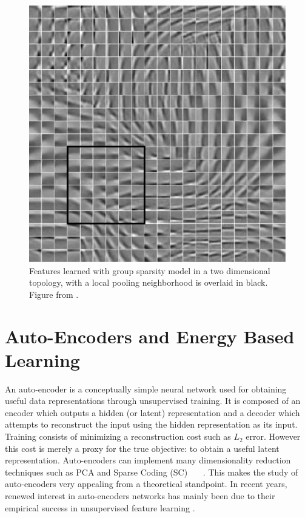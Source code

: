 \begin{figure} 
\centering
\includegraphics[scale=0.4]{./figures/related_work/PSD.png} 
\caption{Features learned with group sparsity model in a two dimensional topology, 
with a local pooling neighborhood is overlaid in black. Figure from \cite{groupSparsity}.}
\label{fig:GSC_features} 
\end{figure} 
 
\section{Auto-Encoders and Energy Based Learning} 

An auto-encoder is a conceptually simple neural network used for obtaining
useful data representations through unsupervised training. It is composed of an
encoder which outputs a hidden (or latent) representation and a decoder which
attempts to reconstruct the input using the hidden representation as its input.
Training consists of minimizing a reconstruction cost such as $L_2$ error.
However this cost is merely a proxy for the true objective: to obtain a useful
latent representation. Auto-encoders can  implement many dimensionality
reduction techniques such as PCA and Sparse Coding (SC)
~\cite{DHS}~\cite{SC}~\cite{LISTA}. This makes the study of auto-encoders very
appealing from a theoretical standpoint. In recent years, renewed interest in
auto-encoders networks has mainly been due to their empirical success in
unsupervised feature learning \cite{SAE1}\cite{SAE2}\cite{CAE}\cite{DAE}. 

